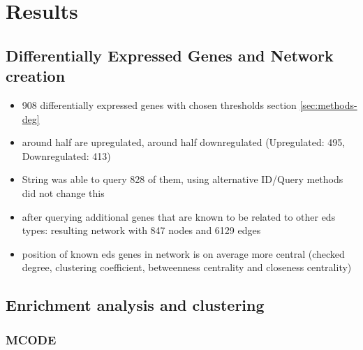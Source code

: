 \section{Results}
\subsection{Differentially Expressed Genes and Network creation}
\begin{itemize}
	\item 908 differentially expressed genes with chosen thresholds section \ref{sec:methods-deg}
	\item around half are upregulated, around half downregulated (Upregulated: 495, Downregulated: 413)
	\item String was able to query 828 of them, using alternative ID/Query methods did not change this
	\item after querying additional genes that are known to be related to other eds types: resulting network with 847 nodes and 6129 edges
	\item position of known eds genes in network is on average more central (checked degree, clustering coefficient, betweenness centrality and closeness centrality)
\end{itemize}

\subsection{Enrichment analysis and clustering}

\subsubsection{MCODE}


